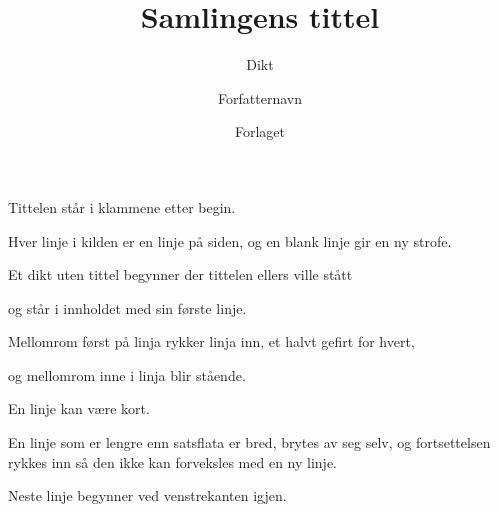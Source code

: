 \documentclass[12pt,twoside]{book}
\begin{document}
\title{Samlingens tittel}
\subtitle{Dikt}
\author{Forfatternavn}
\date{Forlaget}




\booktitlepage



\poemtoc


%


\begin{dikt}
Tittelen står i klammene
etter begin.

Hver linje i kilden
er en linje på siden,
og en blank linje
gir en ny strofe.
\end{dikt}

\begin{dikt}
Et dikt uten tittel
begynner der tittelen ellers ville stått

og står i innholdet
med sin første linje.
\end{dikt}

\begin{dikt}[Innrykk]
Mellomrom først på linja
    rykker linja inn,
        et halvt gefirt for hvert,

og mellomrom   inne i linja   blir stående.
\end{dikt}

\begin{dikt}
En linje kan være kort.

En linje som er lengre enn satsflata er bred, brytes av seg selv, og fortsettelsen rykkes inn så den ikke kan forveksles med en ny linje.

Neste linje begynner ved venstrekanten igjen.
\end{dikt}
\end{document}
